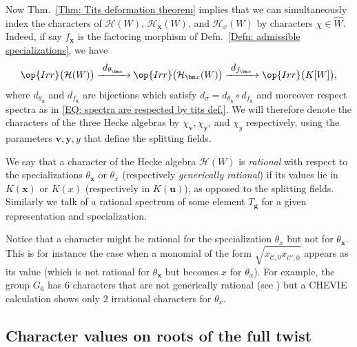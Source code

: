 Now Thm.~\ref{Thm: Tits deformation theorem} implies that we can simultaneously index the characters of $\mathcal{H}(W)$, $\mathcal{H}_{\bm x}(W)$, and $\mathcal{H}_x(W)$ by characters $\chi\in\widehat{W}$. Indeed, if say $f_{\bm x}$ is the factoring morphism of Defn.~\ref{Defn: admissible specializations}, we have \begin{equation}\op{Irr}\big(\mathcal{H}(W)\big)\xrightarrow{\displaystyle \ d_{\theta_{\bm x}}\ }\op{Irr}\big(\mathcal{H}_{\bm x}(W)\big)\xrightarrow{\displaystyle \ d_{f_{\bm x}}\ }\op{Irr}\big(K[W]\big),\label{EQ: admissible specializations and Tits factoring}\end{equation} where $d_{\theta_{\bm x}}$ and $d_{f_{\bm x}}$ are bijections which satisfy $d_{\sigma}=d_{\theta_{\bm x}}\circ d_{f_{\bm x}}$ and moreover respect spectra as in \eqref{EQ: spectra are respected by tits def.}. We will therefore denote the characters of the three Hecke algebras by $\chi_{\bm v}, \chi_{\bm y}$, and $\chi_y$ respectively, using the parameters $\bm v,\bm y,y$ that define the splitting fields.

\begin{defi}\label{Defn: rational character}
We say that a character of the Hecke algebra $\mathcal{H}(W)$ is \emph{rational} with respect to the specializations $\theta_{\bm x}$ or $\theta_x$ \textup{(}respectively \emph{generically rational}\textup{)} if its values lie in $K(\bm x)$ or $K(x)$ \textup{(}respectively in $K(\bm u)$\textup{)}, as opposed to the splitting fields. Similarly we talk of a rational spectrum of some element $T_{\bm g}$ for a given representation and specialization.
\end{defi}

\begin{rema}
Notice that a character might be rational for the specialization $\theta_x$ but not for $\theta_{\bm x}$. This is for instance the case when a monomial of the form $\sqrt{x^{\phantom{N_W}}_{\mathcal{C},0}x^{\phantom{N_W}}_{\mathcal{C'},0}}$ appears as its value (which is not rational for $\theta_{\bm x}$ but becomes $x$ for $\theta_x$). For example, the group $G_6$ has $6$ characters that are not generically rational (see \cite[Table~8.1]{malle-fake-degrees}) but a CHEVIE \cite{chevie-all,chevie-michel} calculation shows only $2$ irrational characters for $\theta_x$.
\end{rema}


\subsection{Character values on roots of the full twist}
\label{Section: Character values on roots of the full twist}

